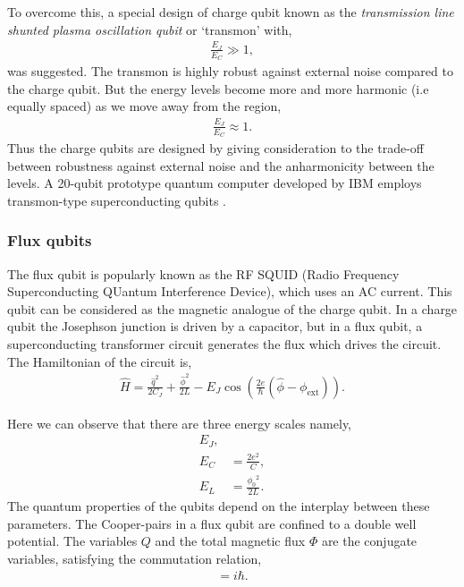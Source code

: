 To overcome this, a special design of charge qubit known as the \textit{transmission line shunted plasma oscillation qubit} or `transmon' \cite{bib:koch2007charge} with,
\begin{align}
\frac{E_J}{E_C} \gg 1,
\end{align}
was suggested. The transmon is highly robust against external noise compared to the charge qubit. But the energy levels become more and more harmonic (i.e equally spaced) as we move away from the region,
\begin{align}
	\frac{E_{J}}{E_{C}} \approx 1.
\end{align}
Thus the charge qubits are designed by giving consideration to the trade-off between robustness against external noise and the anharmonicity between the levels. A 20-qubit prototype quantum computer developed by IBM employs transmon-type superconducting qubits \cite{bib:gambetta2017building}. 

\subsubsection{Flux qubits}

The flux qubit is popularly known as the RF SQUID (Radio Frequency Superconducting QUantum Interference Device), which uses an AC current. This qubit can be considered as the magnetic analogue of the charge qubit. In a charge qubit the Josephson junction is driven by a capacitor, but in a flux qubit, a superconducting transformer circuit generates the flux which drives the circuit. The Hamiltonian of the circuit is,
\begin{align}
\hat{H} = \frac{\hat{q}^{2}}{2 C_{J}} + \frac{\hat\phi^{2}}{2 L} - E_{J} \cos \left( \frac{2e}{\hbar}(\hat\phi - \phi_\mathrm{ext}) \right).
\end{align}

Here we can observe that there are three energy scales namely,
\begin{align}
E_J,& \nonumber\\
E_{C} &= \frac{2e^{2}}{C},\nonumber\\
E_{L} &= \frac{{\phi_{0}}^{2}}{2L}.
\end{align}
The quantum properties of the qubits depend on the interplay between these parameters. The Cooper-pairs in a flux qubit are confined to a double well potential. The variables $Q$ and the total magnetic flux $\Phi$ are the conjugate variables, satisfying the commutation relation,
\begin{align}
[\hat{Q},\hat\Phi] = i \hbar.
\end{align}

